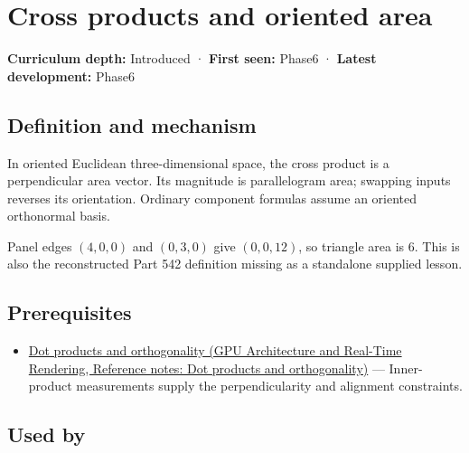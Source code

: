 \hypertarget{appendix-2391db8052b1}{}\label{referencestart:appendix-2391db8052b1}
\section{Cross products and oriented area}\label{appendix-2391db8052b1-cross-products-and-oriented-area}

\textbf{Curriculum depth:} Introduced · \textbf{First seen:} Phase6 · \textbf{Latest development:} Phase6

\begin{allmightroledefinition}

\subsection{Definition and mechanism}\label{appendix-2391db8052b1-definition-and-mechanism}

In oriented Euclidean three-dimensional space, the cross product is a perpendicular area vector. Its magnitude is parallelogram area; swapping inputs reverses its orientation. Ordinary component formulas assume an oriented orthonormal basis.

\end{allmightroledefinition}

Panel edges \((4,0,0)\) and \((0,3,0)\) give \((0,0,12)\), so triangle area is \(6\). This is also the reconstructed Part 542 definition missing as a standalone supplied lesson.

\subsection{Prerequisites}\label{appendix-2391db8052b1-prerequisites}

\begin{itemize}
\tightlist
\item
  \href{../06-GPU-Architecture-and-Real-Time-Rendering/main.pdf\#nameddest=appendix-8bc4e8fc547c}{Dot products and orthogonality (GPU Architecture and Real-Time Rendering, Reference notes: Dot products and orthogonality)} --- Inner-product measurements supply the perpendicularity and alignment constraints.
\end{itemize}

\subsection{Used by}\label{appendix-2391db8052b1-used-by}

